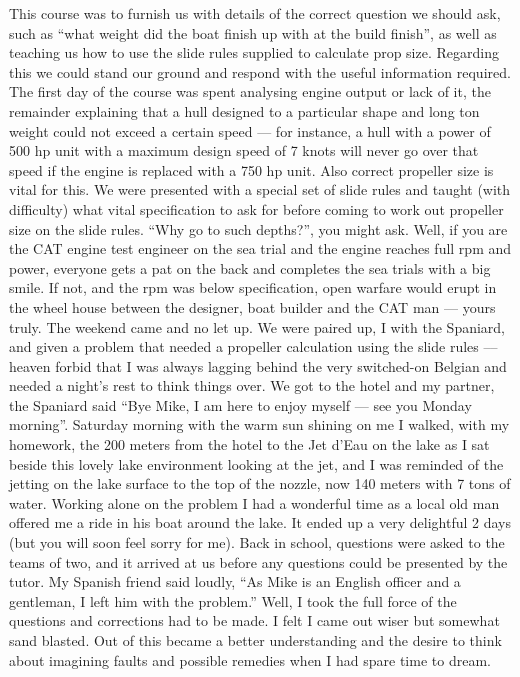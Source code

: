 This course was to furnish us with details of the correct question we should
ask, such as ``what weight did the boat finish up with at the build finish'',
as well as teaching us how to use the slide rules supplied to calculate prop
size. Regarding this we could stand our ground and respond with the useful
information required. The first day of the course was spent analysing engine
output or lack of it, the remainder explaining that a hull designed to a
particular shape and long ton weight could not exceed a certain speed --- for
instance, a hull with a power of 500 hp unit with a maximum design speed of 7
knots will never go over that speed if the engine is replaced with a 750 hp
unit. Also correct propeller size is vital for this. We were presented with a
special set of slide rules and taught (with difficulty) what vital
specification to ask for before coming to work out propeller size on the slide
rules. ``Why go to such depths?'', you might ask. Well, if you are the CAT
engine test engineer on the sea trial and the engine reaches full rpm and
power, everyone gets a pat on the back and completes the sea trials with a big
smile. If not, and the rpm was below specification, open warfare would erupt in
the wheel house between the designer, boat builder and the CAT man --- yours
truly. The weekend came and no let up. We were paired up, I with the Spaniard,
and given a problem that needed a propeller calculation using the slide
rules --– heaven forbid that I was always lagging behind the very switched-on
Belgian and needed a night's rest to think things over. We got to the hotel and
my partner, the Spaniard said ``Bye Mike, I am here to enjoy myself --- see you
Monday morning''. Saturday morning with the warm sun shining on me I walked,
with my homework, the 200 meters from the hotel to the Jet d'Eau on the lake as
I sat beside this lovely lake environment looking at the jet, and I was
reminded of the jetting on the lake surface to the top of the nozzle, now 140
meters with 7 tons of water. Working alone on the problem I had a wonderful
time as a local old man offered me a ride in his boat around the lake. It ended
up a very delightful 2 days (but you will soon feel sorry for me). Back in
school, questions were asked to the teams of two, and it arrived at us before
any questions could be presented by the tutor. My Spanish friend said loudly,
``As Mike is an English officer and a gentleman, I left him with the problem.''
Well, I took the full force of the questions and corrections had to be made. I
felt I came out wiser but somewhat sand blasted. Out of this became a better
understanding and the desire to think about imagining faults and possible
remedies when I had spare time to dream.
